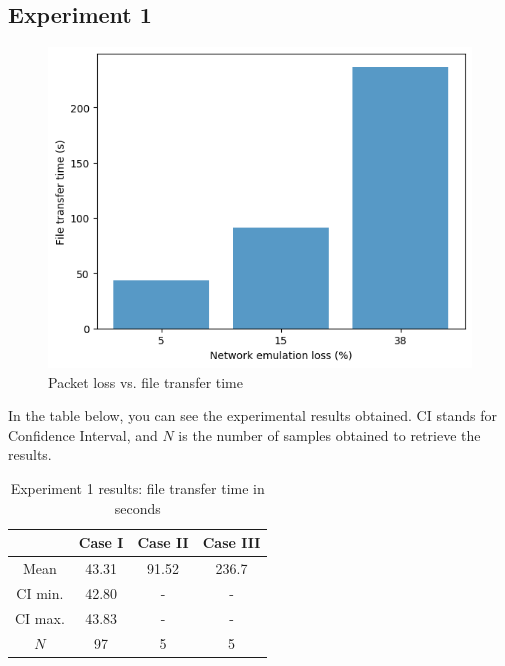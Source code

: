 \documentclass[conference]{IEEEtran}
\begin{document}
\subsection{Experiment 1}

\begin{figure}
    \center
    \includegraphics[width=\columnwidth]{images/chart}
    \caption{Packet loss vs. file transfer time}
    \label{fig:graphexp1}
\end{figure}

In the table below, you can see the experimental results obtained. CI stands for Confidence Interval,
and $N$ is the number of samples obtained to retrieve the results.

\begin{table}[h]
    \centering
    \renewcommand{\arraystretch}{2.5}
        \begin{tabular}{|c|c|c|c|}
        \hline
                          & Case I & Case II & Case III \\
        \hline
                Mean      & 43.31  & 91.52   & 236.7    \\
        \hline
                CI min.   & 42.80  & -       & -    \\
        \hline
                CI max.   & 43.83  & -       & -    \\
        \hline
                $N$       & 97     & 5       & 5    \\
        \hline
        \end{tabular}
    \caption{Experiment 1 results: file transfer time in seconds}
    \label{table:exp1}
\end{table}
\end{document}
